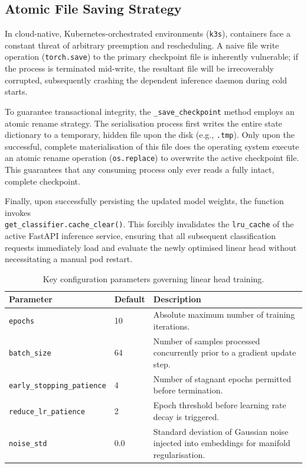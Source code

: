 \subsection{Atomic File Saving Strategy}

In cloud-native, Kubernetes-orchestrated environments (\texttt{k3s}), containers face a constant threat of arbitrary preemption and rescheduling. A naive file write operation (\texttt{torch.save}) to the primary checkpoint file is inherently vulnerable; if the process is terminated mid-write, the resultant file will be irrecoverably corrupted, subsequently crashing the dependent inference daemon during cold starts.

To guarantee transactional integrity, the \texttt{\_save\_checkpoint} method employs an atomic rename strategy. The serialisation process first writes the entire state dictionary to a temporary, hidden file upon the disk (e.g., \texttt{.tmp}). Only upon the successful, complete materialisation of this file does the operating system execute an atomic rename operation (\texttt{os.replace}) to overwrite the active checkpoint file. This guarantees that any consuming process only ever reads a fully intact, complete checkpoint.

Finally, upon successfully persisting the updated model weights, the function invokes\\\texttt{get\_classifier.cache\_clear()}. This forcibly invalidates the \texttt{lru\_cache} of the active FastAPI inference service, ensuring that all subsequent classification requests immediately load and evaluate the newly optimised linear head without necessitating a manual pod restart.

\begin{table}[h]
\centering
\caption{Key configuration parameters governing linear head training.}
\label{tab:head_training_config}
\begin{tabularx}{\textwidth}{l l X}
\toprule
\textbf{Parameter} & \textbf{Default} & \textbf{Description} \\
\midrule
\texttt{epochs} & 10 & Absolute maximum number of training iterations. \\
\texttt{batch\_size} & 64 & Number of samples processed concurrently prior to a gradient update step. \\
\texttt{early\_stopping\_patience} & 4 & Number of stagnant epochs permitted before termination. \\
\texttt{reduce\_lr\_patience} & 2 & Epoch threshold before learning rate decay is triggered. \\
\texttt{noise\_std} & 0.0 & Standard deviation of Gaussian noise injected into embeddings for manifold regularisation. \\
\bottomrule
\end{tabularx}
\end{table}

